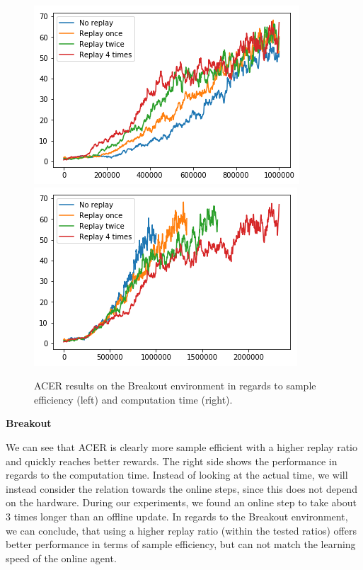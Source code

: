 \begin{figure}[h]
\includegraphics[scale=0.55]{bilder/breakoutbyonline.png}
\includegraphics[scale=0.55]{bilder/breakoutbytime.png}
\caption{ACER results on the Breakout environment in regards to sample efficiency (left) and computation time (right).}
\end{figure}
\textbf{Breakout}

We can see that ACER is clearly more sample efficient with a higher replay ratio and quickly reaches better rewards. 
The right side shows the performance in regards to the computation time. Instead of looking at the actual time, we will instead consider the relation towards the online steps, since this does not depend on the hardware. During our experiments,  we found an online step to take about 3 times longer than an offline update.
In regards to the Breakout environment, we can conclude, that using a higher replay ratio (within the tested ratios) offers better performance in terms of sample efficiency, but can not match the learning speed of the online agent.


